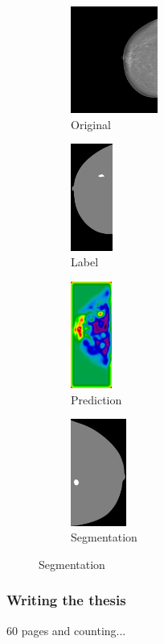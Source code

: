 \documentclass{beamer}
\begin{document}
\begin{frame}
\begin{figure}[h]
\begin{subfigure}{0.25\textwidth}
				\centering
					\includegraphics[height = 3.5cm]{plots/mammogram_ex2.png}
				\caption{Original}
			\end{subfigure}
			\begin{subfigure}{0.16\textwidth}
				\centering
					\includegraphics[height = 3.5cm]{plots/label_ex2.png}
				\caption{Label}
			\end{subfigure}
			\begin{subfigure}{0.17\textwidth}
				\centering
					\includegraphics[height = 3.5cm]{plots/logits_ex2_v3.png}
				\caption{Prediction}
			\end{subfigure}
			\begin{subfigure}{0.22\textwidth}
				\centering
					\includegraphics[height = 3.5cm]{plots/segmentation_ex2_v3.png}
				\caption{Segmentation}
			\end{subfigure}%
		\end{figure}		
	\end{frame}

	\begin{frame}
		\frametitle{Writing the thesis}
		60 pages and counting...
	\end{frame}
	
\end{document}
